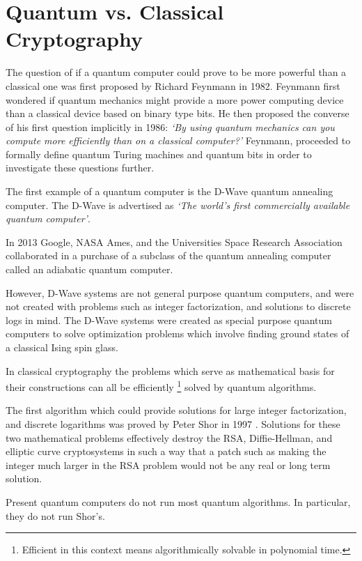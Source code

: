 \section{Quantum vs. Classical Cryptography} 


The question of if a quantum computer could prove to be more powerful than a classical one was first proposed by Richard Feynmann in 1982. Feynmann first wondered if quantum mechanics might provide a more power computing device than a classical device based on binary type bits. He then proposed the converse of his first question implicitly in 1986: \textit{`By using quantum mechanics can you compute more efficiently than on a classical computer?'} Feynmann, proceeded to formally define quantum Turing machines and quantum bits in order to investigate these questions further.


The first example of a quantum computer is the D-Wave quantum annealing computer. The D-Wave is advertised as 
\textit{`The world's first commercially available quantum computer'}. 
 
In 2013 Google, NASA Ames, and the Universities Space Research Association collaborated in a purchase of a subclass of the quantum annealing computer called an adiabatic quantum computer.  

However, D-Wave systems are not general purpose quantum computers, and were not created with problems such as integer factorization, and solutions to discrete logs in mind. The D-Wave systems were created as special purpose quantum computers to solve optimization problems which involve finding ground states of a classical Ising spin glass. 

In classical cryptography the problems which serve as mathematical basis for their constructions can all be efficiently \footnote{Efficient in this context means algorithmically solvable in polynomial time.} solved by quantum algorithms. 

The first algorithm which could provide solutions for large integer factorization, and discrete logarithms was proved by Peter Shor in 1997 \cite{Sho1997}. Solutions for these two mathematical problems effectively destroy the RSA, Diffie-Hellman, and elliptic curve cryptosystems in such a way that a patch such as making the integer much larger in the RSA problem would not be any real or long term solution. 


  
Present quantum computers do not run most quantum algorithms. In particular, they do not run Shor’s. 

